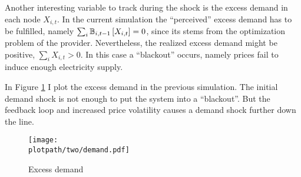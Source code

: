 Another interesting variable to track during the shock is the excess demand in each node $X_{i, t}$. In the current simulation the ``perceived'' excess demand has to be fulfilled, namely $\sum_i \mathbb{B}_{i, t-1}\left[X_{i, t}\right] = 0$, since its stems from the optimization problem of the provider. Nevertheless, the realized excess demand might be positive, $\sum_i X_{i, t} > 0$. In this case a ``blackout'' occurs, namely prices fail to induce enough electricity supply. 

In Figure \ref{fig:twodemand} I plot the excess demand in the previous simulation. The initial demand shock is not enough to put the system into a ``blackout''. But the feedback loop and increased price volatility causes a demand shock further down the line.

\begin{figure}[H]
  \centering
  \texttt{[image: \\plotpath/two/demand.pdf]}
  \caption{Excess demand} \label{fig:twodemand}
\end{figure}